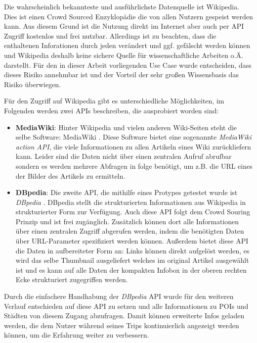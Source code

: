 \vspace{0.25cm}

Die wahrscheinlich bekannteste und ausführlichste Datenquelle ist Wikipedia. Dies ist einen Crowd Sourced Enzyklopädie die von allen Nutzern gespeist werden kann. Aus diesem Grund ist die Nutzung direkt im Internet aber auch per API Zugriff kostenlos und frei nutzbar. Allerdings ist zu beachten, dass die enthaltenen Inforationen durch jeden verändert und ggf. gefälscht werden können und Wikipedia deshalb keine sichere Quelle für wissenschaftliche Arbeiten o.Ä. darstellt. Für den in dieser Arbeit vorliegenden Use Case wurde entscheiden, dass dieses Risiko annehmbar ist und der Vorteil der sehr großen Wissensbasis das Risiko überwiegen. 

\vspace{0.25cm}

Für den Zugriff auf Wikipedia gibt es unterschiedliche Möglichkeiten, im Folgenden werden zwei APIs beschreiben, die ausprobiert worden sind:

\begin{itemize}
	\item \textbf{MediaWiki}: Hinter Wikipedia und vielen anderen Wiki-Seiten steht die selbe Software: MediaWiki \cite{MediaWiki.24.01.2020}. Diese Software bietet eine sogenannte \textit{MediaWiki action API}, die viele Informationen zu allen Artikeln eines Wiki zurückliefern kann. Leider sind die Daten nicht über einen zentralen Aufruf abrufbar sondern es werden mehrere Abfragen in folge benötigt, um z.B. die URL eines der Bilder des Artikels zu ermitteln.
	\item \textbf{DBpedia}: Die zweite API, die mithilfe eines Protypes getestet wurde ist \textit{DBpedia} \cite{DBpedia.02.02.2020}. DBpedia stellt die strukturierten Informationen aus Wikipedia in strukturierter Form zur Verfügung. Auch diese API folgt dem Crowd Souring Prinzip und ist frei zugänglich. Zusätzlich können dort alle Informationen über einen zentralen Zugriff abgerufen werden, indem die benötigten Daten über URL-Parameter spezifiziert werden können. Außerdem bietet diese API die Daten in aufbereiteter Form an: Links können direkt aufgelöst werden, es wird das selbe Thumbnail ausgeliefert welches im original Artikel ausgewählt ist und es kann auf alle Daten der kompakten Infobox in der oberen rechten Ecke strukturiert zugegriffen werden.
\end{itemize}

Durch die einfachere Handhabung der \textit{DBpedia} API wurde für den weiteren Verlauf entschieden auf diese API zu setzen und alle Informationen zu POIs und Städten von diesem Zugang abzufragen. Damit können erweiterte Infos geladen werden, die dem Nutzer während seines Trips kontinuierlich angezeigt werden können, um die Erfahrung weiter zu verbessern.